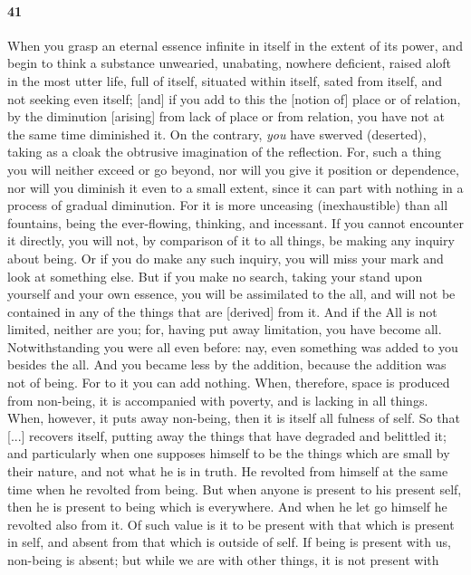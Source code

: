 \documentclass[12pt]{article}
\begin{document}
\paragraph{41} When you grasp an eternal es\-sence infinite in itself in the
extent of its power, and begin to think a substance unwearied, unabating,
nowhere deficient, raised aloft in the most utter life, full of itself,
situated within itself, sated from itself, and not seeking even itself; [and]
if you add to this the [notion of] place or of relation, by the diminution
[arising] from lack of place or from relation, you have not at the same time
diminished it. On the contrary, \textit{you} have swerved (deserted), taking as
a cloak the obtrusive imagination of the reflection. For, such a thing you will
neither exceed or go beyond, nor will you give it position or dependence, nor
will you diminish it even to a small extent, since it can part with nothing in
a process of gradual diminution. For it is more unceasing (inexhaustible) than
all fountains, being the ever-flowing, thinking, and incessant. If you cannot
encounter it directly, you will not, by comparison of it to all things, be
making any inquiry about being. Or if you do make any such inquiry, you will
miss your mark and look at something else. But if you make no search, taking
your stand upon yourself and your own es\-sence, you will be assimilated to the
all, and will not be contained in any of the things that are [derived] from it.
And if the All is not limited, neither are you; for, having put away
limitation, you have become all. Notwithstanding you were all even before: nay,
even something was added to you besides the all. And you became less by the
addition, because the addition was not of being. For to it you can add nothing.
When, therefore, space is produced from non-being, it is accompanied with
poverty, and is lacking in all things. When, however, it puts away non-being,
then it is itself all fulness of self. So that [...] recovers itself, putting
away the things that have degraded and belittled it; and particularly when one
supposes himself to be the things which are small by their nature, and not what
he is in truth. He revolted from himself at the same time when he revolted from
being. But when anyone is present to his present self, then he is present to
being which is everywhere. And when he let go himself he revolted also from it.
Of such value is it to be present with that which is present in self, and
absent from that which is outside of self. If being is present with us,
non-being is absent; but while we are with other things, it is not present with
\end{document}
